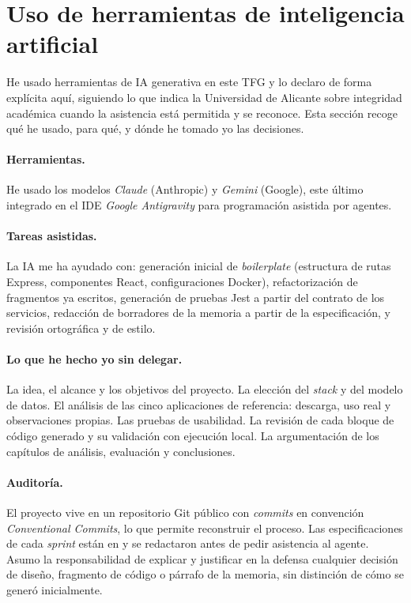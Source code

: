 \section{Uso de herramientas de inteligencia artificial}
\label{sec:uso-ia}

He usado herramientas de IA generativa en este TFG y lo declaro de forma explícita aquí, siguiendo lo que indica la Universidad de Alicante sobre integridad académica cuando la asistencia está permitida y se reconoce. Esta sección recoge qué he usado, para qué, y dónde he tomado yo las decisiones.

\paragraph{Herramientas.}  He usado los modelos \textit{Claude} (Anthropic) y \textit{Gemini} (Google), este último integrado en el IDE \textit{Google Antigravity} para programación asistida por agentes.

\paragraph{Tareas asistidas.}  La IA me ha ayudado con: generación inicial de \textit{boilerplate} (estructura de rutas Express, componentes React, configuraciones Docker), refactorización de fragmentos ya escritos, generación de pruebas Jest a partir del contrato de los servicios, redacción de borradores de la memoria a partir de la especificación, y revisión ortográfica y de estilo.

\paragraph{Lo que he hecho yo sin delegar.}  La idea, el alcance y los objetivos del proyecto. La elección del \textit{stack} y del modelo de datos. El análisis de las cinco aplicaciones de referencia: descarga, uso real y observaciones propias. Las pruebas de usabilidad. La revisión de cada bloque de código generado y su validación con ejecución local. La argumentación de los capítulos de análisis, evaluación y conclusiones.

\paragraph{Auditoría.}  El proyecto vive en un repositorio Git público con \textit{commits} en convención \textit{Conventional Commits}, lo que permite reconstruir el proceso. Las especificaciones de cada \textit{sprint} están en  y se redactaron antes de pedir asistencia al agente. Asumo la responsabilidad de explicar y justificar en la defensa cualquier decisión de diseño, fragmento de código o párrafo de la memoria, sin distinción de cómo se generó inicialmente.

